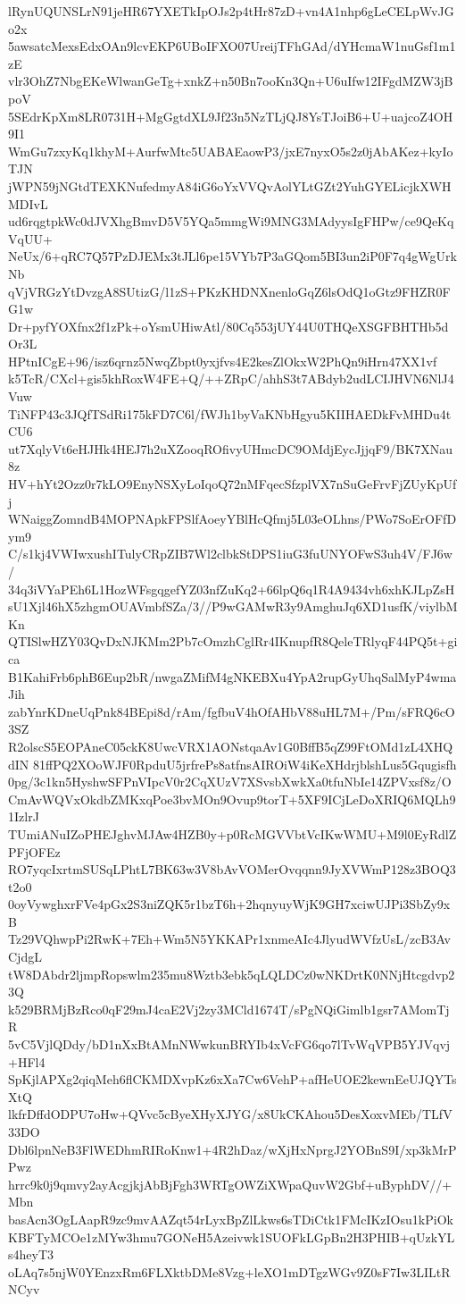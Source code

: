 lRynUQUNSLrN91jeHR67YXETkIpOJs2p4tHr87zD+vn4A1nhp6gLeCELpWvJGo2x
5awsatcMexsEdxOAn9lcvEKP6UBoIFXO07UreijTFhGAd/dYHcmaW1nuGsf1m1zE
vlr3OhZ7NbgEKeWlwanGeTg+xnkZ+n50Bn7ooKn3Qn+U6uIfw12IFgdMZW3jBpoV
5SEdrKpXm8LR0731H+MgGgtdXL9Jf23n5NzTLjQJ8YsTJoiB6+U+uajcoZ4OH9I1
WmGu7zxyKq1khyM+AurfwMtc5UABAEaowP3/jxE7nyxO5s2z0jAbAKez+kyIoTJN
jWPN59jNGtdTEXKNufedmyA84iG6oYxVVQvAolYLtGZt2YuhGYELicjkXWHMDIvL
ud6rqgtpkWc0dJVXhgBmvD5V5YQa5mmgWi9MNG3MAdyysIgFHPw/ce9QeKqVqUU+
NeUx/6+qRC7Q57PzDJEMx3tJLl6pe15VYb7P3aGQom5BI3un2iP0F7q4gWgUrkNb
qVjVRGzYtDvzgA8SUtizG/l1zS+PKzKHDNXnenloGqZ6lsOdQ1oGtz9FHZR0FG1w
Dr+pyfYOXfnx2f1zPk+oYsmUHiwAtl/80Cq553jUY44U0THQeXSGFBHTHb5dOr3L
HPtnICgE+96/isz6qrnz5NwqZbpt0yxjfvs4E2kesZlOkxW2PhQn9iHrn47XX1vf
k5TcR/CXcl+gis5khRoxW4FE+Q/++ZRpC/ahhS3t7ABdyb2udLCIJHVN6NlJ4Vuw
TiNFP43c3JQfTSdRi175kFD7C6l/fWJh1byVaKNbHgyu5KIIHAEDkFvMHDu4tCU6
ut7XqlyVt6eHJHk4HEJ7h2uXZooqROfivyUHmcDC9OMdjEycJjjqF9/BK7XNau8z
HV+hYt2Ozz0r7kLO9EnyNSXyLoIqoQ72nMFqecSfzplVX7nSuGeFrvFjZUyKpUfj
WNaiggZomndB4MOPNApkFPSlfAoeyYBlHcQfmj5L03eOLhns/PWo7SoErOFfDym9
C/s1kj4VWIwxushITulyCRpZIB7Wl2clbkStDPS1iuG3fuUNYOFwS3uh4V/FJ6w/
34q3iVYaPEh6L1HozWFsgqgefYZ03nfZuKq2+66lpQ6q1R4A9434vh6xhKJLpZsH
sU1Xjl46hX5zhgmOUAVmbfSZa/3//P9wGAMwR3y9AmghuJq6XD1usfK/viylbMKn
QTISlwHZY03QvDxNJKMm2Pb7cOmzhCglRr4IKnupfR8QeleTRlyqF44PQ5t+gica
B1KahiFrb6phB6Eup2bR/nwgaZMifM4gNKEBXu4YpA2rupGyUhqSalMyP4wmaJih
zabYnrKDneUqPnk84BEpi8d/rAm/fgfbuV4hOfAHbV88uHL7M+/Pm/sFRQ6cO3SZ
R2olscS5EOPAneC05ckK8UwcVRX1AONstqaAv1G0BffB5qZ99FtOMd1zL4XHQdIN
81ffPQ2XOoWJF0RpduU5jrfrePs8atfnsAIROiW4iKeXHdrjblshLus5Gqugisfh
0pg/3c1kn5HyshwSFPnVIpcV0r2CqXUzV7XSvsbXwkXa0tfuNbIe14ZPVxsf8z/O
CmAvWQVxOkdbZMKxqPoe3bvMOn9Ovup9torT+5XF9ICjLeDoXRIQ6MQLh91IzlrJ
TUmiANuIZoPHEJghvMJAw4HZB0y+p0RcMGVVbtVcIKwWMU+M9l0EyRdlZPFjOFEz
RO7yqcIxrtmSUSqLPhtL7BK63w3V8bAvVOMerOvqqnn9JyXVWmP128z3BOQ3t2o0
0oyVywghxrFVe4pGx2S3niZQK5r1bzT6h+2hqnyuyWjK9GH7xciwUJPi3SbZy9xB
Tz29VQhwpPi2RwK+7Eh+Wm5N5YKKAPr1xnmeAIc4JlyudWVfzUsL/zcB3AvCjdgL
tW8DAbdr2ljmpRopswlm235mu8Wztb3ebk5qLQLDCz0wNKDrtK0NNjHtcgdvp23Q
k529BRMjBzRco0qF29mJ4caE2Vj2zy3MCld1674T/sPgNQiGimlb1gsr7AMomTjR
5vC5VjlQDdy/bD1nXxBtAMnNWwkunBRYIb4xVcFG6qo7lTvWqVPB5YJVqvj+HFl4
SpKjlAPXg2qiqMeh6flCKMDXvpKz6xXa7Cw6VehP+afHeUOE2kewnEeUJQYTsXtQ
lkfrDffdODPU7oHw+QVvc5cByeXHyXJYG/x8UkCKAhou5DesXoxvMEb/TLfV33DO
Dbl6lpnNeB3FlWEDhmRIRoKnw1+4R2hDaz/wXjHxNprgJ2YOBnS9I/xp3kMrPPwz
hrrc9k0j9qmvy2ayAcgjkjAbBjFgh3WRTgOWZiXWpaQuvW2Gbf+uByphDV//+Mbn
basAcn3OgLAapR9zc9mvAAZqt54rLyxBpZlLkws6sTDiCtk1FMcIKzIOsu1kPiOk
KBFTyMCOe1zMYw3hmu7GONeH5Azeivwk1SUOFkLGpBn2H3PHIB+qUzkYLs4heyT3
oLAq7s5njW0YEnzxRm6FLXktbDMe8Vzg+leXO1mDTgzWGv9Z0sF7Iw3LILtRNCyv
